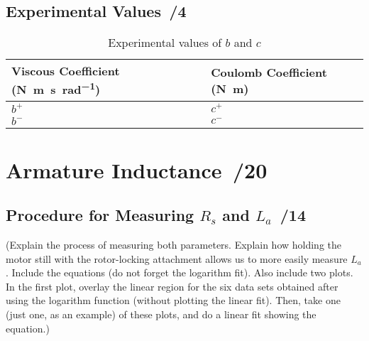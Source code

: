 \documentclass{article}
\newcommand{\score}{\hfill \underline{\hspace{0.65cm}}\,/} %
\begin{document}
\subsection{Experimental Values \score 4}
\begin{table}[phtb] 
\begin{center}
\caption{Experimental values of $b$ and $c$}
\label{tbl:lab4_q3}
\begin{tabular}{lr|lr} \hline \hline
\multicolumn{2}{m{2cm}|}{\cellcolor{lightgray} Viscous Coefficient (\si{\newton\meter\second\per\radian})} & \multicolumn{2}{m{2cm}}{\cellcolor{lightgray} Coulomb Coefficient (\si{\newton\meter})} \\
\hline
$b^+$ &  & $c^+$ &  \\ \hline
$b^-$ &  & $c^-$ &  \\ \hline
\end{tabular}
\end{center}
\end{table}

\section{Armature Inductance \score 20}
\subsection{Procedure for Measuring $R_s$ and $L_a$ \score 14}
(Explain the process of measuring both parameters. Explain how holding the motor still with the rotor-locking attachment allows us to more easily measure $L_a$. Include the equations (do not forget the logarithm fit). 
Also include two plots. In the first plot, overlay the linear region for the six data sets obtained after using the logarithm function (without plotting the linear fit). Then, take one (just one, as an example) of these plots, and do a linear fit showing the equation.)

\end{document}
